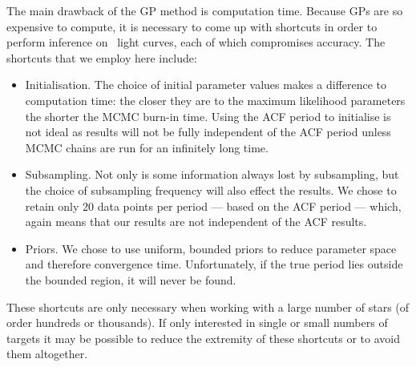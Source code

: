 The main drawback of the GP method is computation time.
Because GPs are so expensive to compute, it is necessary to come up with
shortcuts in order to perform inference on \kepler\ light curves, each of
which compromises accuracy.
The shortcuts that we employ here include:
\begin{itemize}
\item{Initialisation.
The choice of initial parameter values makes a difference to computation time:
the closer they are to the maximum likelihood parameters the shorter the MCMC
burn-in time.
Using the ACF period to initialise is not ideal as results will not be fully
independent of the ACF period unless MCMC chains are run for an infinitely
long time.} \item{Subsampling.
Not only is some information always lost by subsampling, but the choice of
subsampling frequency will also effect the results.
We chose to retain only 20 data points per period --- based on the ACF
period --- which, again means that our results are not independent of the ACF
results.}
\item{Priors.
We chose to use uniform, bounded priors to reduce parameter space and
therefore convergence time.
Unfortunately, if the true period lies outside the bounded region, it will
never be found.}
\end{itemize}

These shortcuts are only necessary when working with a large number of stars
(of order hundreds or thousands).
If only interested in single or small numbers of targets it may be possible to
reduce the extremity of these shortcuts or to avoid them altogether.

